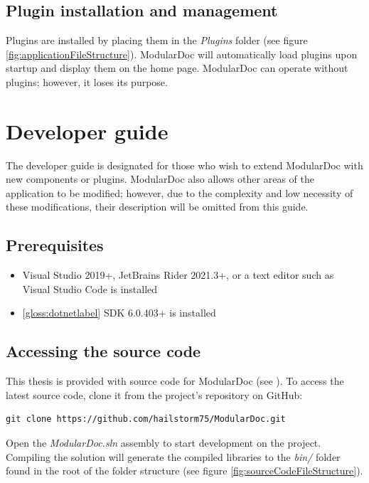 \subsection{Plugin installation and management}

Plugins are installed by placing them in the \textit{Plugins} folder (see figure \ref{fig:applicationFileStructure}). ModularDoc will automatically load plugins upon startup and display them on the home page. ModularDoc can operate without plugins; however, it loses its purpose.

\section{Developer guide}

The developer guide is designated for those who wish to extend ModularDoc with new components or plugins.
ModularDoc also allows other areas of the application to be modified; however, due to the complexity and low necessity of these modifications, their description will be omitted from this guide.

\subsection{Prerequisites}

\begin{itemize}
    \item Visual Studio 2019+, JetBrains Rider 2021.3+, or a text editor such as Visual Studio Code is installed
    \item \ref{gloss:dotnetlabel} SDK 6.0.403+ is installed
\end{itemize}

\subsection{Accessing the source code} \label{subsec:accessingSourceCode}

This thesis is provided with source code for ModularDoc (see ).
To access the latest source code, clone it from the project's repository on GitHub:

\begin{lstlisting}[caption=Script for cloning the ModularDoc project GitHub repository]
    git clone https://github.com/hailstorm75/ModularDoc.git
\end{lstlisting}

Open the \textit{ModularDoc.sln} assembly to start development on the project.
Compiling the solution will generate the compiled libraries to the \textit{bin/} folder found in the root of the folder structure (see figure \ref{fig:sourceCodeFileStructure}).

